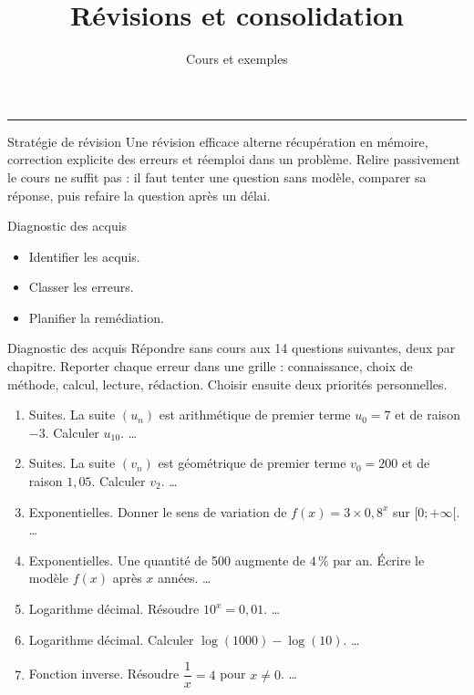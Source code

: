\documentclass[aspectratio=169,10pt]{beamer}
\title{Révisions et consolidation}
\subtitle{Cours et exemples}
\date{}
\author{}
\begin{document}
\begin{frame}[plain]
\vfill
{\inserttitle\par}
\medskip
{\insertsubtitle\par}
\medskip
{\rule{\textwidth}{.5pt}}
\vfill
\end{frame}
\begin{frame}{Stratégie de révision}
Une révision efficace alterne récupération en mémoire, correction explicite des erreurs et réemploi dans un problème. Relire passivement le cours ne suffit pas : il faut tenter une question sans modèle, comparer sa réponse, puis refaire la question après un délai.
\end{frame}
\begin{frame}{Diagnostic des acquis}
\begin{itemize}
\item Identifier les acquis.
\item Classer les erreurs.
\item Planifier la remédiation.

\end{itemize}
\end{frame}
\begin{frame}{Diagnostic des acquis}
Répondre sans cours aux 14 questions suivantes, deux par chapitre. Reporter chaque erreur dans une grille : connaissance, choix de méthode, calcul, lecture, rédaction. Choisir ensuite deux priorités personnelles.

\begin{enumerate}
\setcounter{enumi}{0}\item Suites. La suite \((u_n)\) est arithmétique de premier terme \(u_0=7\) et de raison \(-3\). Calculer \(u_{10}\). \ldots{}

\item Suites. La suite \((v_n)\) est géométrique de premier terme \(v_0=200\) et de raison \(1{,}05\). Calculer \(v_2\). \ldots{}

\item Exponentielles. Donner le sens de variation de \(f(x)=3\times0{,}8^x\) sur \([0;+\infty[\). \ldots{}

\item Exponentielles. Une quantité de 500 augmente de \(4\,\%\) par an. Écrire le modèle \(f(x)\) après \(x\) années. \ldots{}

\item Logarithme décimal. Résoudre \(10^x=0{,}01\). \ldots{}

\item Logarithme décimal. Calculer \(\log(1000)-\log(10)\). \ldots{}

\item Fonction inverse. Résoudre \(\dfrac1x=4\) pour \(x\neq0\). \ldots{}

\end{enumerate}
\end{frame}
\end{document}
